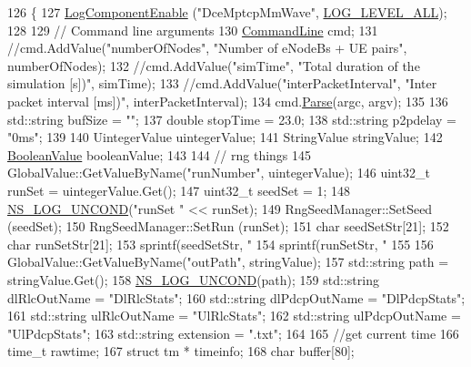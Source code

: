 \begin{DoxyCode}
126 \{
127   \hyperlink{namespacens3_adc4ef4f00bb2f5f4edae67fc3bc27f20}{LogComponentEnable} (\textcolor{stringliteral}{"DceMptcpMmWave"}, \hyperlink{namespacens3_aa6464a4d69551a9cc968e17a65f39bdba022b1237a4fd1b08d034471df3c58586}{LOG\_LEVEL\_ALL});
128 
129   \textcolor{comment}{// Command line arguments}
130   \hyperlink{classns3_1_1CommandLine}{CommandLine} cmd;
131   \textcolor{comment}{//cmd.AddValue("numberOfNodes", "Number of eNodeBs + UE pairs", numberOfNodes);}
132   \textcolor{comment}{//cmd.AddValue("simTime", "Total duration of the simulation [s])", simTime);}
133   \textcolor{comment}{//cmd.AddValue("interPacketInterval", "Inter packet interval [ms])", interPacketInterval);}
134   cmd.\hyperlink{classns3_1_1CommandLine_a5c10b85b3207e5ecb48d907966923156}{Parse}(argc, argv);
135 
136   std::string bufSize = \textcolor{stringliteral}{""};
137   \textcolor{keywordtype}{double} stopTime = 23.0;
138   std::string p2pdelay = \textcolor{stringliteral}{"0ms"};
139 
140   UintegerValue uintegerValue;
141   StringValue stringValue;
142   \hyperlink{classns3_1_1BooleanValue}{BooleanValue} booleanValue;
143   
144   \textcolor{comment}{// rng things}
145   GlobalValue::GetValueByName(\textcolor{stringliteral}{"runNumber"}, uintegerValue);
146   uint32\_t runSet = uintegerValue.Get();
147   uint32\_t seedSet = 1;
148   \hyperlink{log-macros-disabled_8h_a0b36e5e182b37194f85ef1c5e979fb2e}{NS\_LOG\_UNCOND}(\textcolor{stringliteral}{"runSet "} << runSet);
149   RngSeedManager::SetSeed (seedSet);
150   RngSeedManager::SetRun (runSet); 
151   \textcolor{keywordtype}{char} seedSetStr[21];
152   \textcolor{keywordtype}{char} runSetStr[21];
153   sprintf(seedSetStr, \textcolor{stringliteral}{"%
154   sprintf(runSetStr, \textcolor{stringliteral}{"%
155 
156   GlobalValue::GetValueByName(\textcolor{stringliteral}{"outPath"}, stringValue);
157   std::string path = stringValue.Get();
158   \hyperlink{log-macros-disabled_8h_a0b36e5e182b37194f85ef1c5e979fb2e}{NS\_LOG\_UNCOND}(path);
159   std::string dlRlcOutName = \textcolor{stringliteral}{"DlRlcStats"};
160   std::string dlPdcpOutName = \textcolor{stringliteral}{"DlPdcpStats"};
161   std::string ulRlcOutName = \textcolor{stringliteral}{"UlRlcStats"};
162   std::string ulPdcpOutName = \textcolor{stringliteral}{"UlPdcpStats"};
163   std::string extension = \textcolor{stringliteral}{".txt"};
164   
165   \textcolor{comment}{//get current time}
166   time\_t rawtime;
167   \textcolor{keyword}{struct }tm * timeinfo;
168   \textcolor{keywordtype}{char} buffer[80];
}}
\end{DoxyCode}
